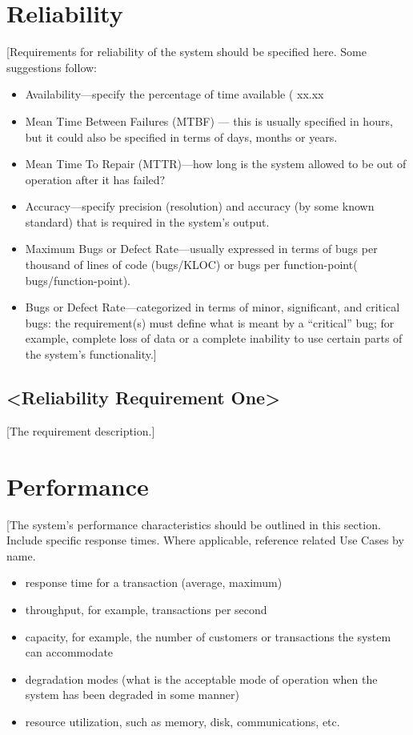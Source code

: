 \documentclass[a4paper,12pt,chapterprefix=false,bibliography=totoc,listof=totoc]{scrreprt}
\begin{document}
\section{Reliability}
[Requirements for reliability of the system should be specified here. Some suggestions follow:
\begin{itemize}
	\item Availability—specify the percentage of time available ( xx.xx%
	\item Mean Time Between Failures (MTBF) — this is usually specified in hours, but it could also be specified in terms of days, months or years.
	\item Mean Time To Repair (MTTR)—how long is the system allowed to be out of operation after it has failed?
	\item Accuracy—specify precision (resolution) and accuracy (by some known standard) that is required in the system’s output.
	\item Maximum Bugs or Defect Rate—usually expressed in terms of bugs per thousand of lines of code (bugs/KLOC) or bugs per function-point( bugs/function-point).
	\item Bugs or Defect Rate—categorized in terms of minor, significant, and critical bugs: the requirement(s) must define what is meant by a “critical” bug; for example, complete loss of data or a complete inability to use certain parts of the system’s functionality.]
\end{itemize}

\subsection{<Reliability Requirement One>}
[The requirement description.]

\section{Performance}
[The system’s performance characteristics should be outlined in this section. Include specific response times. Where applicable, reference related Use Cases by name.
\begin{itemize}
	\item response time for a transaction (average, maximum)
	\item throughput, for example, transactions per second
	\item capacity, for example, the number of customers or transactions the system can accommodate
	\item degradation modes (what is the acceptable mode of operation when the system has been degraded in some manner)
	\item resource utilization, such as memory, disk, communications, etc.
\end{itemize}
\end{document}
